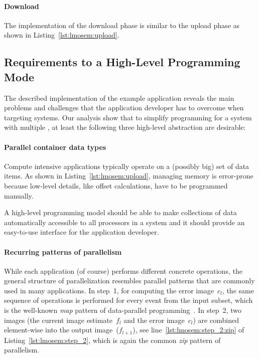 \paragraph{Download}
The implementation of the download phase is similar to the upload phase as shown in Listing~\ref{lst:lmosem:upload}.


\subsection{Requirements to a High-Level Programming Mode}
\label{section:requirements}
The described implementation of the example application reveals the main problems and challenges that the application developer has to overcome when targeting \GPU systems.
Our analysis show that to simplify programming for a system with multiple \GPUs, at least the following three high-level abstraction are desirable:

\paragraph{Parallel container data types}
Compute intensive applications typically operate on a (possibly big) set of data items.
As shown in Listing~\ref{lst:lmosem:upload}, managing memory is error-prone because low-level details, like offset calculations, have to be programmed manually.

A high-level programming model should be able to make collections of data automatically accessible to all processors in a system and it should provide an easy-to-use interface for the application developer.

\paragraph{Recurring patterns of parallelism}
While each application (of course) performs different concrete operations, the general structure of parallelization resembles parallel patterns that are commonly used in many applications.
In step~1, for computing the error image~$c_l$, the same sequence of operations is performed for every event from the input subset, which is the well-known \emph{map} pattern of data-parallel programming~\cite{GorlatchCo2011}.
In step~2, two images (the current image estimate~$f_l$ and the error image~$c_l$) are combined element-wise into the output image~($f_{l+1}$), see line~\ref{lst:lmosem:step_2:zip} of Listing~\ref{lst:lmosem:step_2}, which is again the common \emph{zip} pattern of parallelism.

